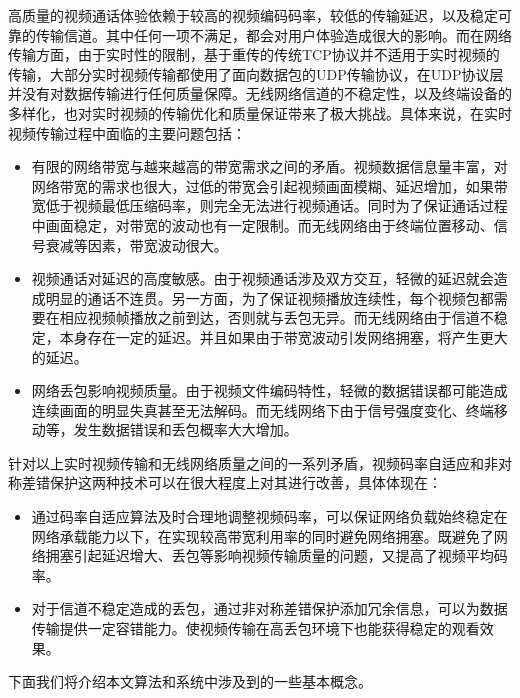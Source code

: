 高质量的视频通话体验依赖于较高的视频编码码率，较低的传输延迟，以及稳定可靠的传输信道。其中任何一项不满足，都会对用户体验造成很大的影响。而在网络传输方面，由于实时性的限制，基于重传的传统TCP协议并不适用于实时视频的传输，大部分实时视频传输都使用了面向数据包的UDP传输协议，在UDP协议层并没有对数据传输进行任何质量保障。无线网络信道的不稳定性，以及终端设备的多样化，也对实时视频的传输优化和质量保证带来了极大挑战。具体来说，在实时视频传输过程中面临的主要问题包括：

\begin{itemize}
    \item 有限的网络带宽与越来越高的带宽需求之间的矛盾。视频数据信息量丰富，对网络带宽的需求也很大，过低的带宽会引起视频画面模糊、延迟增加，如果带宽低于视频最低压缩码率，则完全无法进行视频通话。同时为了保证通话过程中画面稳定，对带宽的波动也有一定限制。而无线网络由于终端位置移动、信号衰减等因素，带宽波动很大。
    \item 视频通话对延迟的高度敏感。由于视频通话涉及双方交互，轻微的延迟就会造成明显的通话不连贯。另一方面，为了保证视频播放连续性，每个视频包都需要在相应视频帧播放之前到达，否则就与丢包无异。而无线网络由于信道不稳定，本身存在一定的延迟。并且如果由于带宽波动引发网络拥塞，将产生更大的延迟。
    \item 网络丢包影响视频质量。由于视频文件编码特性，轻微的数据错误都可能造成连续画面的明显失真甚至无法解码。而无线网络下由于信号强度变化、终端移动等，发生数据错误和丢包概率大大增加。
\end{itemize}

针对以上实时视频传输和无线网络质量之间的一系列矛盾，视频码率自适应和非对称差错保护这两种技术可以在很大程度上对其进行改善，具体体现在：

\begin{itemize}
    \item 通过码率自适应算法及时合理地调整视频码率，可以保证网络负载始终稳定在网络承载能力以下，在实现较高带宽利用率的同时避免网络拥塞。既避免了网络拥塞引起延迟增大、丢包等影响视频传输质量的问题，又提高了视频平均码率。
    \item 对于信道不稳定造成的丢包，通过非对称差错保护添加冗余信息，可以为数据传输提供一定容错能力。使视频传输在高丢包环境下也能获得稳定的观看效果。
\end{itemize}

下面我们将介绍本文算法和系统中涉及到的一些基本概念。

